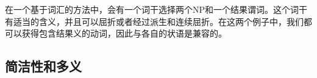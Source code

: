 \zl
%
    在一个基于词汇的方法中，会有一个词干选择两个NP和一个结果谓词。这个词干有适当的含义，并且可以屈折或者经过派生和连续屈折。在这两个例子中，我们都可以获得包含结果义的动词，因此与各自的状语是兼容的。

\subsection{简洁性和多义}
\label{polysemy-subsec}

